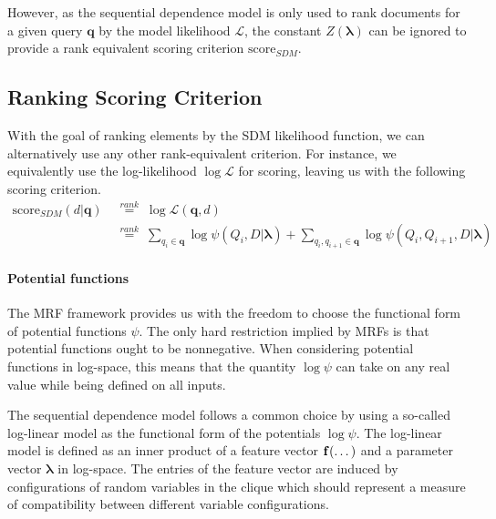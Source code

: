 \documentclass[]{article}
\begin{document}
However, as the sequential dependence model is only used to rank documents
for a given query $\mathbf{q}$ by the model likelihood $\mathcal{L}$,
the constant $Z(\boldsymbol{\lambda})$ can be ignored to provide a rank
equivalent scoring criterion $\mbox{score}_{SDM}$. 

\subsection{Ranking Scoring Criterion}

With the goal of ranking elements by the SDM likelihood function,
we can alternatively use any other rank-equivalent criterion. For instance,
we equivalently use the log-likelihood $\log\mathcal{L}$ for scoring,
leaving us with the following scoring criterion.
\begin{align}
 \mbox{score}_{SDM}(d|\mathbf{q})& \; \stackrel{rank}{=} \; \log\mathcal{L}(\mathbf{q},d)\label{eq:sdm-factorized}\\
 & \; \stackrel{rank}{=} \; \sum_{q_{i}\in\mathbf{q}}\log\psi(Q_{i},D|\boldsymbol{\lambda})+\sum_{q_{i},q_{i+1}\in\mathbf{q}}\log\psi(Q_{i},Q_{i+1},D|\boldsymbol{\lambda})\nonumber
\end{align}

%
%


\paragraph{Potential functions}

The MRF framework provides us with the freedom to choose the functional
form of potential functions $\psi$. The only hard restriction implied
by MRFs is that potential functions ought to be nonnegative. When
considering potential functions in log-space, this means that the
quantity $\log\psi$ can take on any real value while being defined
on all inputs. 

The sequential dependence model follows a common choice by using a
so-called log-linear model as the functional form of the potentials
$\log\psi$. The log-linear model is defined as an inner product of
a feature vector $\mbox{\ensuremath{\mathbf{f}}}(\dots)$ and a parameter
vector $\boldsymbol{\lambda}$ in log-space. The entries of the feature
vector are induced by configurations of random variables in the clique
which should represent a measure of compatibility between different
variable configurations.
\end{document}
